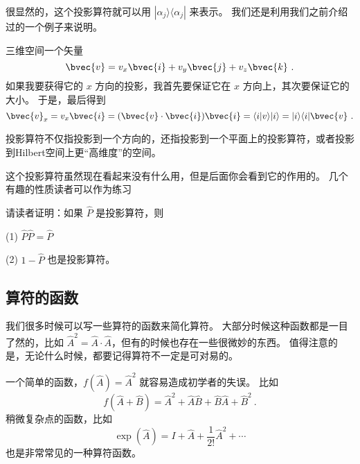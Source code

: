 很显然的，这个投影算符就可以用 $|\alpha_j\rangle\langle\alpha_j|$ 来表示。 我们还是利用我们之前介绍过的一个例子来说明。

\begin{example}{}
三维空间一个矢量
\begin{equation}
\bvec{v} = v_x\bvec{i} + v_y\bvec{j} + v_z \bvec{k}~.
\end{equation}
如果我要获得它的 $x$ 方向的投影，我首先要保证它在 $x$ 方向上，其次要保证它的大小。 于是，最后得到
\begin{equation}
\bvec{v}_x = v_x\bvec{i} = (\bvec{v}\cdot\bvec{i})\bvec{i} = \langle i|v\rangle |i\rangle = |i\rangle\langle i| \bvec{v}~.
\end{equation}
\end{example}

投影算符不仅指投影到一个方向的，还指投影到一个平面上的投影算符，或者投影到Hilbert空间上更“高维度”的空间。

这个投影算符虽然现在看起来没有什么用，但是后面你会看到它的作用的。 几个有趣的性质读者可以作为练习

\begin{exercise}{}
请读者证明：如果 $\hat{P}$ 是投影算符，则

(1) $\hat{P}\hat{P} = \hat{P}$

(2) $1-\hat{P}$ 也是投影算符。
\end{exercise}

\subsection{算符的函数}

我们很多时候可以写一些算符的函数来简化算符。 大部分时候这种函数都是一目了然的，比如 $\hat{A}^2 = \hat{A}\cdot\hat{A}$，但有的时候也存在一些很微妙的东西。 值得注意的是，无论什么时候，都要记得算符不一定是可对易的。

一个简单的函数，$f(\hat{A}) = \hat{A}^2$ 就容易造成初学者的失误。 比如
\begin{equation}
f(\hat{A}+\hat{B}) = \hat{A}^2 + \hat{A}\hat{B} + \hat{B}\hat{A} + \hat{B}^2~.
\end{equation}
稍微复杂点的函数，比如
\begin{equation}
\exp(\hat{A}) = I + \hat{A} + \frac{1}{2!}\hat{A}^2 + \cdots
\end{equation}
也是非常常见的一种算符函数。

